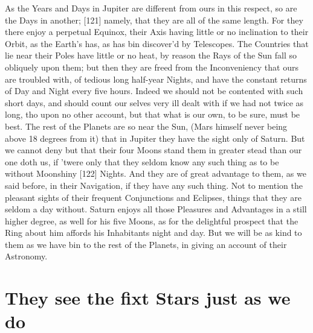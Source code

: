 \documentclass[letterpaper]{book}
\begin{document}
As the Years and Days in Jupiter are different from ours in this respect, so
are the Days in another; [121] namely, that they are all of the same length.
For they there enjoy a perpetual Equinox, their Axis having little or no
inclination to their Orbit, as the Earth's has, as has bin discover'd by
Telescopes. The Countries that lie near their Poles have little or no heat,
by reason the Rays of the Sun fall so obliquely upon them; but then they are
freed from the Inconveniency that ours are troubled with, of tedious long
half-year Nights, and have the constant returns of Day and Night every
five hours. Indeed we should not be contented with such short days, and
should count our selves very ill dealt with if we had not twice as long, tho
upon no other account, but that what is our own, to be sure, must be best.
The rest of the Planets are so near the Sun, (Mars himself never being above
18 degrees from it) that in Jupiter they have the sight only of Saturn.  But
we cannot deny but that their four Moons stand them in greater stead than
our one doth us, if 'twere only that they seldom know any such thing as to
be without Moonshiny [122] Nights. And they are of great advantage to them,
as we said before, in their Navigation, if they have any such thing. Not to
mention the pleasant sights of their frequent Conjunctions and Eclipses,
things that they are seldom a day without.  Saturn enjoys all those
Pleasures and Advantages in a still higher degree, as well for his five
Moons, as for the delightful prospect that the Ring about him affords his
Inhabitants night and day. But we will be as kind to them as we have bin to
the rest of the Planets, in giving an account of their Astronomy.


\section{They see the fixt Stars just as we do}
\end{document}
